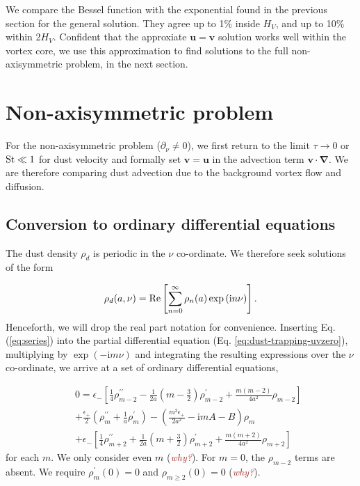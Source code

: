 \documentclass[apj]{emulateapj}
\renewcommand{\v}[1]{{\boldsymbol{#1}}} %
\def\brown#1{\textcolor{brown}{#1}}
\newcommand{\comm}[1]{({\it \brown{#1}})}
\newcommand{\del}{\v{\nabla}}
\newcommand{\Eq}[1]{Eq. (\ref{#1})}
\newcommand{\eq}[1]{\Eq{#1}}
\newcommand{\eqp}[1]{(Eq. \ref{#1})}
\newcommand{\beq}{\begin{equation}}
\newcommand{\eeq}{\end{equation}}
\newcommand{\beqn}{\begin{eqnarray}}
\newcommand{\eeqn}{\end{eqnarray}}
\begin{document}
We compare the Bessel function with the exponential found in the
previous section for the general solution. They agree up to 1\% inside
$H_V$, and up to 10\% within 2$H_V$. Confident that the approxiate
$\v{u}=\v{v}$ solution works well within the vortex core, we use this
approximation to find solutions to the full non-axisymmetric problem,
in the next section. 


\section{Non-axisymmetric problem}
For the non-axisymmetric problem ($\partial_\nu\neq0$), we first
return to the limit $\tau\to0$ or $\rm{St}\ll 1$ for dust velocity and
formally set $\bm{v}=\bm{u}$ in the advection term 
$\bm{v}\cdot\del$. We are therefore comparing dust advection due to
the background vortex flow and diffusion. 

\subsection{Conversion to ordinary differential equations}
The dust density $\rho_d$ is periodic in the $\nu$ co-ordinate. We
therefore seek solutions of the form

\beq\label{eq:series}
\rho_d(a,\nu) = {\rm Re}
\left[\sum_{n=0}^\infty\rho_n(a)\exp{\left(\mathrm{i}n\nu\right)} \right].
\eeq
Henceforth, we will drop the real part notation for convenience. Inserting
\eq{eq:series} into the partial differential equation \eqp{eq:dust-trapping-uvzero},
multiplying by $\exp{(-\mathrm{i}m\nu)}$ and integrating the resulting
expressions over the $\nu$ co-ordinate, we arrive at a set of
ordinary differential equations,

\beqn\label{eq:ode1}
&&0=\epsilon_{-}\left[\frac{1}{4}\rho_{m-2}^{\prime\prime}
-\frac{1}{2a}\left(m-\frac{3}{2}\right)\rho_{m-2}^\prime +
\frac{m(m-2)}{4a^2}\rho_{m-2}\right] \nonumber\\
&&+\frac{\epsilon_+}{2}\left(\rho_m^{\prime\prime}+\frac{1}{a}\rho_m^\prime\right)
-\left(\frac{m^2\epsilon_+}{2a^2}-\mathrm{i}mA-B\right)\rho_m\nonumber\\
&&+\epsilon_{-}\left[\frac{1}{4}\rho_{m+2}^{\prime\prime}
+\frac{1}{2a}\left(m+\frac{3}{2}\right)\rho_{m+2}^\prime +
\frac{m(m+2)}{4a^2}\rho_{m+2} \right]
\eeqn
for each $m$. We only consider even $m$ \comm{why?}. For $m=0$, the $\rho_{m-2}$
terms are absent. We require $\rho_m^\prime(0)=0$ and
$\rho_{m\geq2}(0)=0$ \comm{why?}. 
\end{document}
